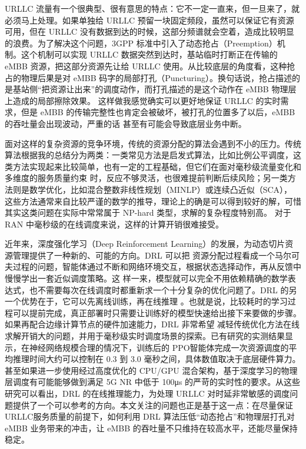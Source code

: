 URLLC 流量有一个很典型、很有意思的特点：它不一定一直来，但一旦来了，就必须马上处理。如果单独给 URLLC 预留一块固定频段，虽然可以保证它有资源可用，但在 URLLC 没有数据到达的时候，这部分频谱就会空着，造成比较明显的浪费\cite{alsenwi2021, sohaib2023}。为了解决这个问题，3GPP 标准中引入了动态抢占（Preemption）机制。这个机制可以实现 URLLC 数据突然到达时，基站临时打断正在传输的 eMBB 资源，把这部分资源先让给 URLLC 使用\cite{anand2020, huang2022deluxe}。从比较底层的角度看，这种抢占的物理后果是对 eMBB 码字的局部打孔（Puncturing）。换句话说，抢占描述的是基站侧“把资源让出来”的调度动作，而打孔描述的是这个动作在 eMBB 物理层上造成的局部擦除效果。
这样做我感觉确实可以更好地保证 URLLC 的实时需求，但是 eMBB 的传输完整性也肯定会被破坏，被打孔的位置多了以后，eMBB的吞吐量会出现波动，严重的话
甚至有可能会导致底层业务中断\cite{alsenwi2021, saggese2021}。

面对这样的复杂资源的竞争环境，传统的资源分配的算法会遇到不小的压力。传统算法根据我的总结分为两类：一类常见方法是启发式算法，比如比例公平调度，这类方法实现起来比较简单，也有一定的工程基础，但它们在面对毫秒级流量变化和多维度的服务质量约束
时，反应不够灵活，也很难提前判断后续风险\cite{dai2025}；另一类方法则是数学优化，比如混合整数非线性规划（MINLP）或连续凸近似（SCA），
这些方法通常来自比较严谨的数学的推导，理论上的确是可以得到较好的解，可惜其实这类问题在实际中常常属于 NP-hard 类型，求解的复杂程度特别高。
对于 RAN 中毫秒级的在线调度来说，这样的计算开销很难接受\cite{feng2020, sohaib2023}。

近年来，深度强化学习（Deep Reinforcement Learning）的发展，为动态切片资源管理提供了一种新的、可能的方向\cite{luong2019, hua2020}。DRL 可以把
资源分配过程看成一个马尔可夫过程的问题，智能体通过不断和网络环境交互，根据状态选择动作，再从反馈中慢慢学出一套近似调度策略\cite{filali2022, choi2024}。这
样一来，模型就可以完全不用依赖精确的数学表达式，也不需要每次在线调度时都重新求一个十分复杂的优化问题了。DRL 的另一个优势在于，它可以先离线训练，再在线推理
。也就是说，比较耗时的学习过程可以提前完成，真正部署时只需要让训练好的模型快速给出接下来要做的步骤。如果再配合边缘计算节点的硬件加速能力，DRL 非常希望
减轻传统优化方法在线求解开销大的问题，并用于毫秒级实时调度场景的探索\cite{filali2022, alcaraz2023}。已有研究的实测结果显示，在神经网络规模合理的情况下，训练后的 PPO智能体完成一次资源调度的平均推理时间大约可以控制在 0.3 到 3.0 毫秒之间，具体数值取决于底层硬件算力\cite{saggese2021}。甚至如果进一步使用经过高度优化的 CPU/GPU 混合架构，基于深度学习的物理层调度有可能能够做到满足 5G NR 中低于 100μs 的严苛的实时性的要求\cite{huang2022deluxe}。从这些研究可以看出，DRL 的在线推理能力，为处理 URLLC 对时延非常敏感的调度问题提供了一个可以参考的方向\cite{huang2022deluxe, saggese2021}。本文关注的问题也正是基于这一点：在尽量保证 URLLC服务质量的前提下，如何利用 DRL 算法压低“动态抢占”和物理层打孔对 eMBB 业务带来的冲击，让 eMBB 的吞吐量不只维持在较高水平，还能尽量保持稳定。

